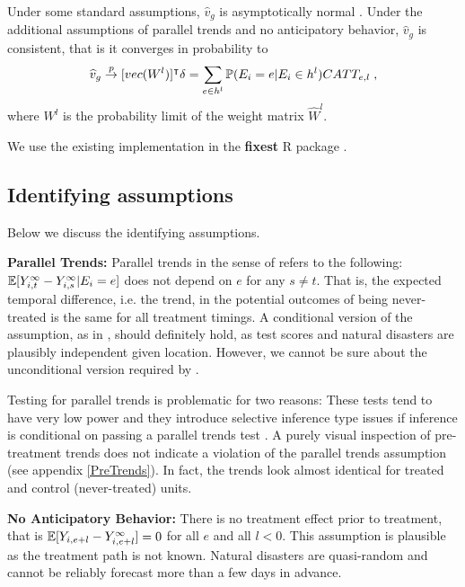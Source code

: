 Under some standard assumptions, $\widehat{v}_g$ is asymptotically normal \citep[for a proof and a detailed description of said assumptions see][Appendix C]{Sun_2021}. Under the additional assumptions of parallel trends and no anticipatory behavior, $\widehat{v}_g$ is consistent, that is it converges in probability to
\begin{align*}
	\widehat{v}_g \overset{p}{\to} [vec(W^{l})]^\intercal \delta = \sum_{e \in h^{l}} \mathbb{P}(E_i = e | E_i \in h^{l}) CATT_{e, l} \; ,
\end{align*}
where $W^{l}$ is the probability limit of the weight matrix $\widehat{W}^l$.


We use the existing implementation in the \textbf{fixest} R package \citep{Berge_2018}.

\subsection{Identifying assumptions}

Below we discuss the identifying assumptions.

\textbf{Parallel Trends:} Parallel trends in the sense of \cite{Sun_2021} refers to the following: $\mathbb{E}[Y_{i, t}^{\infty} - Y_{i, s}^{\infty} | E_i = e]$ does not depend on $e$ for any $s \neq t$. That is, the expected temporal difference, i.e. the trend, in the potential outcomes of being never-treated is the same for all treatment timings. A conditional version of the assumption, as in \cite{Callaway_2021}, should definitely hold, as test scores and natural disasters are plausibly independent given location. However, we cannot be sure about the unconditional version required by \cite{Sun_2021}.

Testing for parallel trends is problematic for two reasons: These tests tend to have very low power and they introduce selective inference type issues if inference is conditional on passing a parallel trends test \citep{Rambachan_2019}. A purely visual inspection of pre-treatment trends does not indicate a violation of the parallel trends assumption (see appendix \ref{PreTrends}). In fact, the trends look almost identical for treated and control (never-treated) units.

\textbf{No Anticipatory Behavior:} There is no treatment effect prior to treatment, that is $\mathbb{E}[Y_{i, e+l} - Y_{i, e+l}^{\infty}] = 0$ for all $e$ and all $l < 0$. This assumption is plausible as the treatment path is not known. Natural disasters are quasi-random and cannot be reliably forecast more than a few days in advance.




